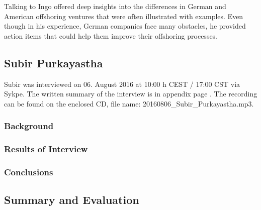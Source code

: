 Talking to Ingo offered deep insights into the differences in German and American offshoring ventures that were often illustrated with examples. Even though in his experience, German companies face many obstacles, he provided action items that could help them improve their offshoring processes.

\subsection{Subir Purkayastha}
Subir was interviewed on 06. August 2016 at 10:00 h CEST / 17:00 CST via Sykpe. The written summary of the interview is in appendix page \pageref{int:Subir}. The recording can be found on the enclosed CD, file name: 20160806\_Subir\_Purkayastha.mp3.
\subsubsection{Background}
\subsubsection{Results of Interview}
\subsubsection{Conclusions}


\subsection{Summary and Evaluation}
